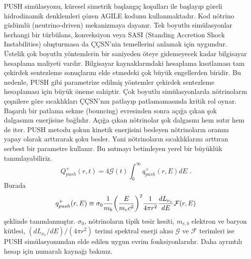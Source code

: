 PUSH simülasyonu, küresel simetrik başlangıç koşulları ile başlayıp göreli hidrodinamik denklemleri çözen AGILE \cite{Liebendoerfer:2000fw} kodunu kullanmaktadır. Kod nötrino güdümlü (neutrino-driven) mekanizmaya dayanır. Tek boyutlu simülasyonlar herhangi bir türbülans, konveksiyon veya SASI (Standing Accretion Shock Instabilities) oluşturmasa da ÇÇSN'nin temellerini anlamak için uygundur. Üstelik çok boyutlu yöntemlerin bir saniyeden öteye gidemeyecek kadar bilgisayar hesaplama maliyeti vardır. Bilgisayar kaynaklarındaki  hesaplama kısıtlaması tam çekirdek sentezleme sonuçlarını elde etmedeki çok büyük engellerden biridir. Bu nedenle, PUSH gibi parametrize edilmiş yöntemler çekirdek sentezleme hesaplaması için büyük öneme sahiptir. Çok boyutlu simülasyonlarda nötrinoların çeşnilere göre sıcaklıkları ÇÇSN'nın patlayıp patlamamasında kritik rol oynar. Başarılı bir patlama sekme (bouncing) evresinden sonra açığa çıkan şok dalgasının enerjisine bağlıdır. Açığa çıkan nötrinolar şok dalgasını hem ısıtır hem de iter. PUSH metodu şokun kinetik enerjisini besleyen nötrinoların oranını yapay olarak arttırarak şoku besler. Yani nötrinoların sıcaklıklarını arttıran serbest bir parametre kullanır. Bu ısıtmayı betimleyen yerel bir büyüklük tanımlayabiliriz.
\begin{equation}
    Q^{+}_{push}(r,t)=4\mathcal{G}(t) \int_{0}^{\infty}q^{+}_{push}(r,E)dE \text{ .}
\end{equation}
Burada 
\begin{equation} \label{eqn:PUSHartificial}
    q^{+}_{push}(r,E) \equiv \sigma_{0}\frac{1}{m_{b}}\qty(\frac{E}{m_{e}c^{2}})^{2} \frac{1}{4\pi r^{2}} \frac{d L_{\nu_{x}}}{dE} \mathcal{F}(r,E)
\end{equation}
şeklinde tanımlanmıştır. $ \sigma_{0} $, nötrinoların tipik tesir kesiti, $ m_{e,b} $ elektron ve baryon kütlesi, $ (dL_{\nu_{x}}/dE)/(4\pi r^{2}) $ terimi spektral enerji akısı $ \mathcal{G} $ ve $ \mathcal{F} $ terimleri ise PUSH simülasyonundan elde edilen uygun evrim fonksiyonlarıdır. Daha ayrıntılı hesap için \cite{2015ApJ...806..275P} numaralı kaynağı bakınız. 

